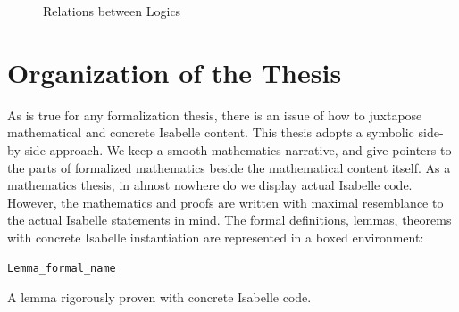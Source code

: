 \bigskip
\begin{figure}
\centering
{}
    \caption{Relations between Logics}
    \label{fig:logics}
\end{figure}




\section{Organization of the Thesis}
As is true for any formalization thesis, there is an issue of how to juxtapose mathematical and concrete Isabelle content. This thesis adopts a symbolic side-by-side approach. We keep a smooth mathematics narrative, and give pointers to the parts of formalized mathematics beside the mathematical content itself. As a mathematics thesis, in almost nowhere do we display actual Isabelle code. However, the mathematics and proofs are written with maximal resemblance to the actual Isabelle statements in mind. The formal definitions, lemmas, theorems with concrete Isabelle instantiation are represented in a boxed environment:

\begin{blemma}
\texttt{Lemma\_formal\_name}

    A lemma rigorously proven with concrete Isabelle code.
\end{blemma}

